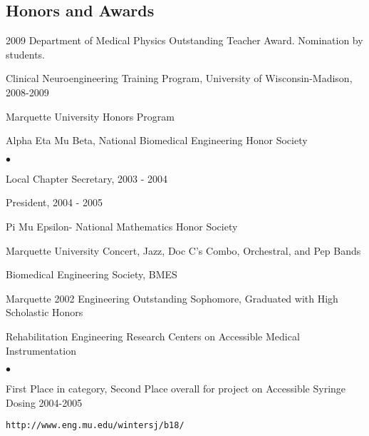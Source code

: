 \documentclass[margin,line]{res}
\newenvironment{list2}{
  \begin{list}{$\bullet$}{%
      \setlength{\itemsep}{0in}
      \setlength{\parsep}{0in} \setlength{\parskip}{0in}
      \setlength{\topsep}{0in} \setlength{\partopsep}{0in} 
      \setlength{\leftmargin}{0.2in}}}{\end{list}}
\begin{document}
\begin{resume}
\section{\sc Honors and Awards} 

2009 Department of Medical Physics Outstanding Teacher Award.  Nomination by students.

Clinical Neuroengineering Training Program, University of Wisconsin-Madison, 2008-2009

Marquette University Honors Program

Alpha Eta Mu Beta, National Biomedical Engineering Honor Society
\begin{list2}
 \item Local Chapter Secretary, 2003 - 2004
 \item President, 2004 - 2005
\end{list2}
 
Pi Mu Epsilon- National Mathematics Honor Society

Marquette University Concert, Jazz, Doc C's Combo, Orchestral, and Pep Bands

Biomedical Engineering Society, BMES

Marquette 2002 Engineering Outstanding Sophomore, Graduated with High Scholastic Honors

Rehabilitation Engineering Research Centers on Accessible Medical Instrumentation
\begin{list2}
 \item First Place in category, Second Place overall for project on Accessible Syringe Dosing 2004-2005
 \item \begin{verbatim}http://www.eng.mu.edu/wintersj/b18/\end{verbatim}
\end{list2}
%




\end{resume}
\end{document}
